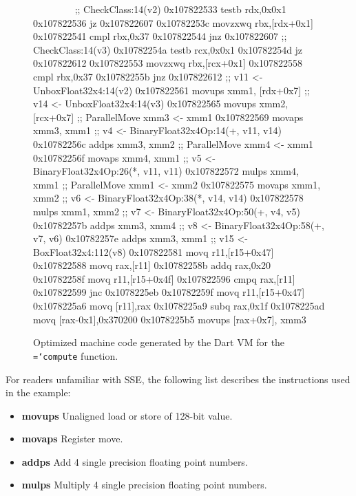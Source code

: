 \documentclass[preprint]{sigplanconf}
\newcommand{\ttt}[1]{{\texttt{\hyphenchar\font=`\-\relax #1}}}%
\begin{document}
\begin{figure}[t]
\begin{small}
\begin{program}[style=tt]
\ \ \ \ \ \ \ \ \tab{}
        ;; CheckClass:14(v2)\untab{}
0x107822533 testb rdx,0x0x1
0x107822536 jz 0x107822607
0x10782253c movzxwq rbx,[rdx+0x1]
0x107822541 cmpl rbx,0x37
0x107822\tab{}544 jnz 0x107822607
        ;; CheckClass:14(v3)\untab{}
0x10782254a testb rcx,0x0x1
0x10782254d jz 0x107822612
0x107822553 movzxwq rbx,[rcx+0x1]
0x107822558 cmpl rbx,0x37
0x107822\tab{}55b jnz 0x107822612
        ;; v11 <- UnboxFloat32x4:14(v2)\untab{}
0x107822\tab{}561 movups xmm1, [rdx+0x7]
        ;; v14 <- UnboxFloat32x4:14(v3)\untab{}
0x107822\tab{}565 movups xmm2, [rcx+0x7]
        ;; ParallelMove xmm3 <- xmm1\untab{}
0x107822\tab{}569 movaps xmm3, xmm1
        ;; v4 <- BinaryFloat32x4Op:14(+, v11, v14)\untab{}
0x107822\tab{}56c addps xmm3, xmm2
        ;; ParallelMove xmm4 <- xmm1\untab{}
0x107822\tab{}56f movaps xmm4, xmm1
        ;; v5 <- BinaryFloat32x4Op:26(*, v11, v11)\untab{}
0x107822\tab{}572 mulps xmm4, xmm1
        ;; ParallelMove xmm1 <- xmm2\untab{}
0x107822\tab{}575 movaps xmm1, xmm2
        ;; v6 <- BinaryFloat32x4Op:38(*, v14, v14)\untab{}
0x107822\tab{}578 mulps xmm1, xmm2
        ;; v7 <- BinaryFloat32x4Op:50(+, v4, v5)\untab{}
0x107822\tab{}57b addps xmm3, xmm4
        ;; v8 <- BinaryFloat32x4Op:58(+, v7, v6)\untab{}
0x107822\tab{}57e addps xmm3, xmm1
        ;; v15 <- BoxFloat32x4:112(v8)\untab{}
0x107822581 movq r11,[r15+0x47]
0x107822588 movq rax,[r11]
0x10782258b addq rax,0x20
0x10782258f movq r11,[r15+0x4f]
0x107822596 cmpq rax,[r11]
0x107822599 jnc 0x1078225eb
0x10782259f  movq r11,[r15+0x47]
0x1078225a6 movq [r11],rax
0x1078225a9 subq rax,0x1f
0x1078225ad movq [rax-0x1],0x370200
0x1078225b5 movups [rax+0x7], xmm3
\end{program}
\end{small}
\caption{Optimized machine code generated by the Dart VM for the \ttt{compute}
function.}
\label{fig:asm}
\end{figure}

For readers unfamiliar with SSE, the following list describes the instructions
used in the example:

\begin{itemize}
\item \textbf{movups} Unaligned load or store of 128-bit value.
\item \textbf{movaps} Register move.
\item \textbf{addps} Add 4 single precision floating point numbers.
\item \textbf{mulps} Multiply 4 single precision floating point numbers.
\end{itemize}
\end{document}
